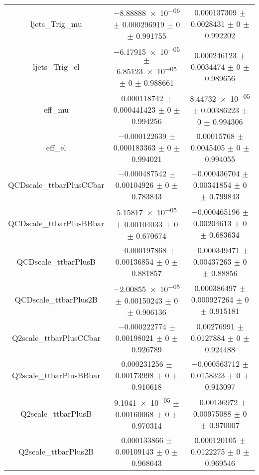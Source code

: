 \begin{table}
\begin{tabular}{ccc}
ljets\_Trig\_mu & \num{-8.88888e-06} $\pm$ \num{0.000296919} $\pm$ \num{0} $\pm$ \num{0.991755} & \num{0.000137309} $\pm$ \num{0.0028431} $\pm$ \num{0} $\pm$ \num{0.992202}\\
ljets\_Trig\_el & \num{-6.17915e-05} $\pm$ \num{6.85123e-05} $\pm$ \num{0} $\pm$ \num{0.988661} & \num{0.000246123} $\pm$ \num{0.0034474} $\pm$ \num{0} $\pm$ \num{0.989656}\\
eff\_mu & \num{0.000118742} $\pm$ \num{0.000441423} $\pm$ \num{0} $\pm$ \num{0.994256} & \num{8.44732e-05} $\pm$ \num{0.00386223} $\pm$ \num{0} $\pm$ \num{0.994306}\\
eff\_el & \num{-0.000122639} $\pm$ \num{0.000183363} $\pm$ \num{0} $\pm$ \num{0.994021} & \num{0.00015768} $\pm$ \num{0.0045405} $\pm$ \num{0} $\pm$ \num{0.994055}\\
QCDscale\_ttbarPlusCCbar & \num{-0.000487542} $\pm$ \num{0.00104926} $\pm$ \num{0} $\pm$ \num{0.783843} & \num{-0.000436704} $\pm$ \num{0.00341854} $\pm$ \num{0} $\pm$ \num{0.799843}\\
QCDscale\_ttbarPlusBBbar & \num{5.15817e-05} $\pm$ \num{0.00104033} $\pm$ \num{0} $\pm$ \num{0.670674} & \num{-0.000465196} $\pm$ \num{0.00204613} $\pm$ \num{0} $\pm$ \num{0.683634}\\
QCDscale\_ttbarPlusB & \num{-0.000197868} $\pm$ \num{0.00136854} $\pm$ \num{0} $\pm$ \num{0.881857} & \num{-0.000349471} $\pm$ \num{0.00437263} $\pm$ \num{0} $\pm$ \num{0.88856}\\
QCDscale\_ttbarPlus2B & \num{-2.00855e-05} $\pm$ \num{0.00150243} $\pm$ \num{0} $\pm$ \num{0.906136} & \num{0.000386497} $\pm$ \num{0.000927264} $\pm$ \num{0} $\pm$ \num{0.915181}\\
Q2scale\_ttbarPlusCCbar & \num{-0.000222774} $\pm$ \num{0.00198021} $\pm$ \num{0} $\pm$ \num{0.926789} & \num{0.00276991} $\pm$ \num{0.0127884} $\pm$ \num{0} $\pm$ \num{0.924488}\\
Q2scale\_ttbarPlusBBbar & \num{0.000231256} $\pm$ \num{0.00173998} $\pm$ \num{0} $\pm$ \num{0.910618} & \num{-0.000563712} $\pm$ \num{0.0158323} $\pm$ \num{0} $\pm$ \num{0.913097}\\
Q2scale\_ttbarPlusB & \num{9.1041e-05} $\pm$ \num{0.00160068} $\pm$ \num{0} $\pm$ \num{0.970314} & \num{-0.00136972} $\pm$ \num{0.00975088} $\pm$ \num{0} $\pm$ \num{0.970007}\\
Q2scale\_ttbarPlus2B & \num{0.000133866} $\pm$ \num{0.00109143} $\pm$ \num{0} $\pm$ \num{0.968643} & \num{0.000120105} $\pm$ \num{0.0122275} $\pm$ \num{0} $\pm$ \num{0.969546}\\

\end{tabular}
\end{table}
